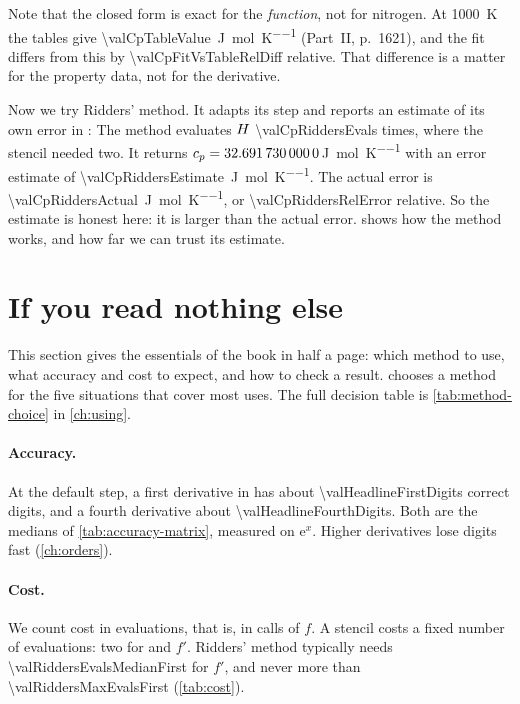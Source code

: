 Note that the closed form is exact for the \emph{function}, not for nitrogen. At \SI{1000}{\kelvin} the tables give
\SI{\valCpTableValue}{\joule\per\mole\per\kelvin} (Part~II, p.~1621),\cite{chase1998} and the fit differs from this
by \num{\valCpFitVsTableRelDiff} relative. That difference is a matter for the property data, not for the derivative.

Now we try Ridders' method. It adapts its step and reports an estimate of its own error in :
The method evaluates $H$ \num{\valCpRiddersEvals} times, where the stencil needed two. It returns
$c_p = \num{32.6917300000}$\,\si{\joule\per\mole\per\kelvin} with an error estimate of \SI{\valCpRiddersEstimate}{\joule\per\mole\per\kelvin}. The actual error is
\SI{\valCpRiddersActual}{\joule\per\mole\per\kelvin}, or \num{\valCpRiddersRelError} relative. So the estimate is
honest here: it is larger than the actual error.  shows how the method works, and how far we can
trust its estimate.

\section{If you read nothing else}\label{sec:why-summary}

This section gives the essentials of the book in half a page: which method to use, what accuracy and cost to expect,
and how to check a result.  chooses a method for the five situations that cover most uses. The full
decision table is \cref{tab:method-choice} in \cref{ch:using}.

\paragraph{Accuracy.} At the default step, a first derivative in  has about
\num{\valHeadlineFirstDigits} correct digits, and a fourth derivative about \num{\valHeadlineFourthDigits}. Both are the medians of
\cref{tab:accuracy-matrix}, measured on $\mathrm{e}^x$. Higher derivatives lose digits fast (\cref{ch:orders}).

\paragraph{Cost.} We count cost in evaluations, that is, in calls of $f$. A stencil costs a fixed number of
evaluations: two for  and $f'$. Ridders' method typically needs \num{\valRiddersEvalsMedianFirst}
for $f'$, and never more than \num{\valRiddersMaxEvalsFirst} (\cref{tab:cost}).

